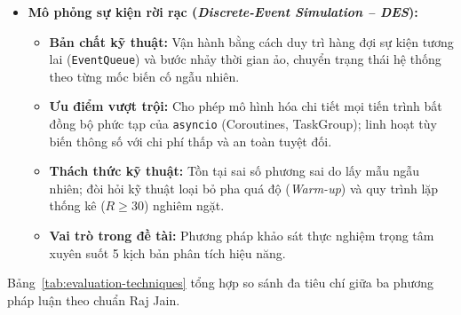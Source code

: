 \begin{itemize}[leftmargin=1.5em, itemsep=6pt]
    \item \textbf{Mô phỏng sự kiện rời rạc (\textit{Discrete-Event Simulation -- DES}):}
    \begin{itemize}[leftmargin=1.2em, itemsep=2pt, topsep=2pt]
        \item \textbf{Bản chất kỹ thuật:} Vận hành bằng cách duy trì hàng đợi sự kiện tương lai (\texttt{EventQueue}) và bước nhảy thời gian ảo, chuyển trạng thái hệ thống theo từng mốc biến cố ngẫu nhiên.
        \item \textbf{Ưu điểm vượt trội:} Cho phép mô hình hóa chi tiết mọi tiến trình bất đồng bộ phức tạp của \texttt{asyncio} (Coroutines, TaskGroup); linh hoạt tùy biến thông số với chi phí thấp và an toàn tuyệt đối.
        \item \textbf{Thách thức kỹ thuật:} Tồn tại sai số phương sai do lấy mẫu ngẫu nhiên; đòi hỏi kỹ thuật loại bỏ pha quá độ (\textit{Warm-up}) và quy trình lặp thống kê ($R \ge 30$) nghiêm ngặt.
        \item \textbf{Vai trò trong đề tài:} Phương pháp khảo sát thực nghiệm trọng tâm xuyên suốt 5 kịch bản phân tích hiệu năng.
    \end{itemize}
\end{itemize}

\newpage
Bảng~\ref{tab:evaluation-techniques} tổng hợp so sánh đa tiêu chí giữa ba phương pháp luận theo chuẩn Raj Jain.

